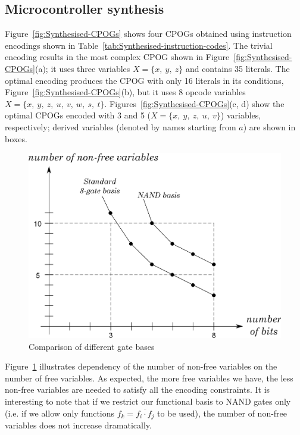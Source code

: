 \subsection{Microcontroller synthesis\label{app-sub-Microcontroller-synthesis}}

Figure~\ref{fig:Synthesised-CPOGs} shows four CPOGs obtained using
instruction encodings shown in Table~\ref{tab:Synthesised-instruction-codes}.
The trivial encoding results in the most complex CPOG shown in Figure~\ref{fig:Synthesised-CPOGs}(a);
it uses three variables $X=\{x,\ y,\ z\}$ and contains 35 literals.
The optimal encoding produces the CPOG with only 16 literals in its
conditions, Figure~\ref{fig:Synthesised-CPOGs}(b), but it uses 8
opcode variables $X=\{x,\ y,\ z,\ u,\ v,\ w,\ s,\ t\}$. Figures~\ref{fig:Synthesised-CPOGs}(c,
d) show the optimal CPOGs encoded with 3 and 5 ($X=\{x,\ y,\ z,\ u,\ v\}$)
variables, respectively; derived variables (denoted by names starting
from $a$) are shown in boxes.

\begin{figure}[!t]
\begin{centering}
\includegraphics[scale=0.52]{fig/encoding_graph}
\par\end{centering}

\caption{Comparison of different gate bases\label{fig:Comparison-of-different}}
\end{figure}


Figure~\ref{fig:Comparison-of-different} illustrates dependency
of the number of non-free variables on the number of free variables.
As expected, the more free variables we have, the less non-free variables
are needed to satisfy all the encoding constraints. It is interesting
to note that if we restrict our functional basis to NAND gates only
(i.e. if we allow only functions $f_{k}=\overline{f_{i}\cdot f_{j}}$
to be used), the number of non-free variables does not increase dramatically.

